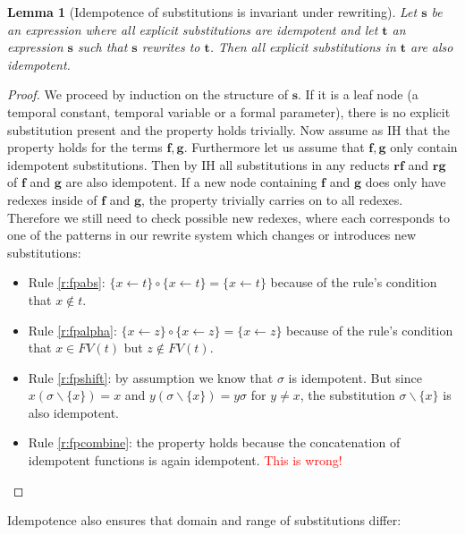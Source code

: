 \documentclass[a4paper]{article}
\newcommand{\fpsubstin}[1]{\{#1\}}
\newcommand{\fpscat}[0]{\circ}
\newcommand{\fpwith}{\leftarrow}
\newcommand{\fpwithoutset}[1]{\backslash\{#1\}}
\newcommand{\metavar}[1]{\mathbf{#1}}
\newtheorem{lemma}{Lemma}
\begin{document}
\begin{lemma}[Idempotence of substitutions is invariant under rewriting]
  \label{lem:fpsubst-idempotent}
  Let $\metavar{s}$ be an expression where all explicit substitutions are
  idempotent and let $\metavar{t}$ an expression $\metavar{s}$ such that
  $\metavar{s}$ rewrites to $\metavar{t}$. Then all explicit substitutions
  in $\metavar{t}$ are also idempotent.
\end{lemma}
\begin{proof}
  We proceed by induction on the structure of $\metavar{s}$. If it is a
  leaf node (a temporal constant, temporal variable or a formal parameter),
  there is no explicit substitution present and the property holds
  trivially. Now assume as IH that the property holds for the terms
  $\metavar{f},\metavar{g}$. Furthermore let us assume that
  $\metavar{f},\metavar{g}$ only contain idempotent substitutions. Then by
  IH all substitutions in any reducts $\metavar{rf}$ and $\metavar{rg}$ of
  $\metavar{f}$ and $\metavar{g}$ are also
  idempotent. If a new node containing $\metavar{f}$ and $\metavar{g}$ does
  only have redexes inside of $\metavar{f}$ and $\metavar{g}$, the property
  trivially carries on to all redexes. Therefore we still need to check
  possible new redexes, where each corresponds to one of the patterns in
  our rewrite system which changes or introduces new substitutions:
  \begin{itemize}
  \item Rule \ref{r:fpabs}: $\fpsubstin{x \fpwith t} \fpscat
    \fpsubstin{x \fpwith t} = \fpsubstin{x \fpwith t}$ because of the
    rule's condition that $x \not \in t$.
  \item Rule \ref{r:fpalpha}: $\fpsubstin{x \fpwith z}\fpscat\fpsubstin{
      x \fpwith z} = \fpsubstin{x \fpwith z}$ because of the rule's
    condition that $x \in FV(t)$ but $z \not \in FV(t)$.
  \item Rule \ref{r:fpshift}: by assumption we know that $\sigma$ is
    idempotent. But since $x(\sigma\fpwithoutset{x})=x$ and $y(\sigma
    \fpwithoutset{x})=y\sigma$ for $y \neq x$, the substitution
    $\sigma\fpwithoutset{x}$ is also idempotent.
  \item Rule \ref{r:fpcombine}: the property holds because the concatenation
    of idempotent functions is again idempotent. \textcolor{red}{This is wrong!}
  \end{itemize}
\end{proof}

Idempotence also ensures that domain and range of substitutions differ:
\end{document}

